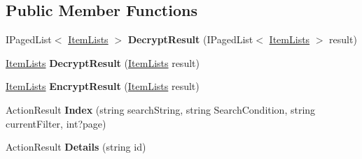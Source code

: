\subsection*{Public Member Functions}
\begin{DoxyCompactItemize}
\item 
I\+Paged\+List$<$ \hyperlink{class_cloud_bread_admin_web_1_1_item_lists}{Item\+Lists} $>$ {\bfseries Decrypt\+Result} (I\+Paged\+List$<$ \hyperlink{class_cloud_bread_admin_web_1_1_item_lists}{Item\+Lists} $>$ result)\hypertarget{class_cloud_bread_admin_web_1_1_controllers_1_1_____item_lists_controller_ad8659bd7cbef45426a79580f5510a0c6}{}\label{class_cloud_bread_admin_web_1_1_controllers_1_1_____item_lists_controller_ad8659bd7cbef45426a79580f5510a0c6}

\item 
\hyperlink{class_cloud_bread_admin_web_1_1_item_lists}{Item\+Lists} {\bfseries Decrypt\+Result} (\hyperlink{class_cloud_bread_admin_web_1_1_item_lists}{Item\+Lists} result)\hypertarget{class_cloud_bread_admin_web_1_1_controllers_1_1_____item_lists_controller_a6cc8574ddc153003f481966c0a5fa953}{}\label{class_cloud_bread_admin_web_1_1_controllers_1_1_____item_lists_controller_a6cc8574ddc153003f481966c0a5fa953}

\item 
\hyperlink{class_cloud_bread_admin_web_1_1_item_lists}{Item\+Lists} {\bfseries Encrypt\+Result} (\hyperlink{class_cloud_bread_admin_web_1_1_item_lists}{Item\+Lists} result)\hypertarget{class_cloud_bread_admin_web_1_1_controllers_1_1_____item_lists_controller_a41b71896627af57fe3fb98f47e6a6fdf}{}\label{class_cloud_bread_admin_web_1_1_controllers_1_1_____item_lists_controller_a41b71896627af57fe3fb98f47e6a6fdf}

\item 
Action\+Result {\bfseries Index} (string search\+String, string Search\+Condition, string current\+Filter, int?page)\hypertarget{class_cloud_bread_admin_web_1_1_controllers_1_1_____item_lists_controller_a1783cf8bee550d11b3138288b9f6f388}{}\label{class_cloud_bread_admin_web_1_1_controllers_1_1_____item_lists_controller_a1783cf8bee550d11b3138288b9f6f388}

\item 
Action\+Result {\bfseries Details} (string id)\hypertarget{class_cloud_bread_admin_web_1_1_controllers_1_1_____item_lists_controller_a8e4f59d0290a2d52cf6c6213a3dfb597}{}\label{class_cloud_bread_admin_web_1_1_controllers_1_1_____item_lists_controller_a8e4f59d0290a2d52cf6c6213a3dfb597}


\end{DoxyCompactItemize}
